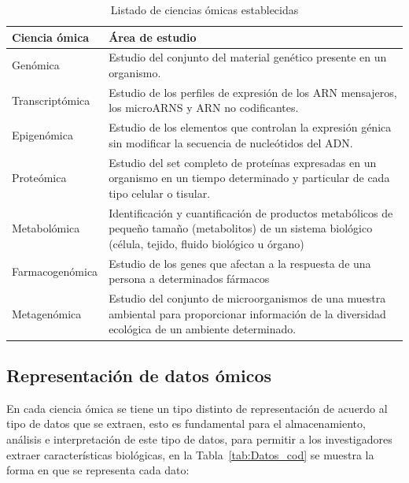 \begin{table}[!h]
    \scriptsize
    \centering
    \caption{Listado de ciencias ómicas establecidas}
    
    \begin{tabular}{
    >{\centering\arraybackslash}m{4cm} 
    >{\centering\arraybackslash}m{9cm}}
\hline 
        \textbf{Ciencia ómica} & 
        \textbf{Área de estudio}
\\      
    \hline \hline 

    Genómica &
    Estudio del conjunto del material genético presente en un organismo.
\\
    \hline
    Transcriptómica &
    Estudio de los perfiles de expresión de los ARN mensajeros, los microARNS y ARN no codificantes.
\\
    \hline
    Epigenómica &
    Estudio de los elementos que controlan la expresión génica sin modificar la secuencia de nucleótidos del ADN.
\\
    \hline
     Proteómica &
     Estudio del set completo de proteínas expresadas en un organismo en un tiempo determinado y particular de cada tipo celular o tisular.
\\
     \hline
     Metabolómica &
     Identificación y cuantificación de productos metabólicos de pequeño tamaño (metabolitos) de un sistema biológico (célula, tejido, fluido biológico u órgano)
\\
     \hline
     Farmacogenómica &
     Estudio de los genes que afectan a la respuesta de una persona a determinados fármacos
\\
     \hline
     Metagenómica &
     Estudio del conjunto de microorganismos de una muestra ambiental para proporcionar información de la diversidad ecológica de un ambiente determinado.
\\
    
\hline
    \end{tabular}
    \label{tab:List_omic}
\end{table}

\subsection{Representación de datos ómicos}

En cada ciencia ómica se tiene un tipo distinto de representación de acuerdo al tipo de datos que se extraen, esto es fundamental para el almacenamiento, análisis e interpretación de este tipo de datos, para permitir a los investigadores extraer características biológicas, en la Tabla~\ref{tab:Datos_cod} se muestra la forma en que se representa cada dato:


